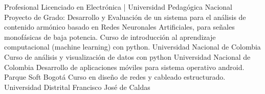 %
%
%

\vspace{1em}
\begin{scholarship}
    {Profesional Licenciado en Electrónica | Universidad Pedagógica Nacional }
    {Proyecto de Grado: Desarrollo y Evaluación de un sistema para el análisis de contenido armónico basado en Redes Neuronales Artificiales, para señales monofásicas de baja potencia.}
    {Curso de introducción al aprendizaje computacional (machine learning) con python.}
    {Universidad Nacional de Colombia}    
    {Curso de análisis y visualización de datos con python}
    {Universidad Nacional de Colombia}
    {Desarrollo de aplicaciones móviles para sistema operativo android.}
    {Parque Soft Bogotá}
    {Curso en diseño de redes y cableado estructurado.}
    {Universidad Distrital Francisco José de Caldas}
\end{scholarship}